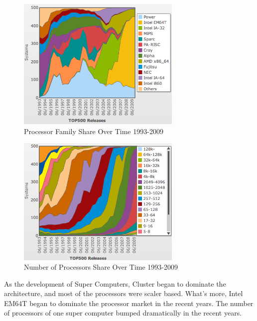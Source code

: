 \documentclass[12pt]{article}
\begin{document}
\begin{enumerate}
\begin{description}
\begin{figure}[h!]
\end{figure}
\begin{figure}[h!]
	\begin{center}
		\includegraphics[width=0.7\textwidth, angle=0]{proc-family-share.png}
		\caption{\label{fig:proc-arch-share}Processor Family Share Over Time 1993-2009}
	\end{center}
\end{figure}
\begin{figure}[h!]
	\begin{center}
		\includegraphics[width=0.7\textwidth, angle=0]{proc-num-share.png}
		\caption{\label{fig:proc-num-share}Number of Processors Share Over Time 1993-2009}
	\end{center}
\end{figure}
As the development of Super Computers, Cluster began to dominate the architecture, 
and most of the processors were scaler based. What's more, Intel EM64T began to 
dominate the processor market in the recent years. The number of processors of one 
super computer bumped dramatically 
in the recent years.
\end{description}


\end{enumerate}
\end{document}
